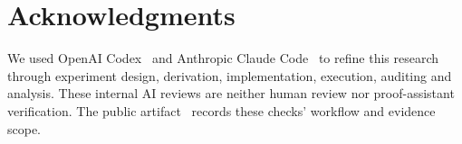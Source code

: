 \documentclass[conference,10pt]{IEEEtran}
\begin{document}
\section*{Acknowledgments}
We used OpenAI Codex~\cite{codex} and Anthropic Claude Code~\cite{claudecode}
to refine this research through experiment design, derivation, implementation,
execution, auditing and analysis. These internal AI reviews are neither
human review nor proof-assistant verification. The public artifact~\cite{artifactrepository}
records these checks' workflow and evidence scope.

\end{document}
